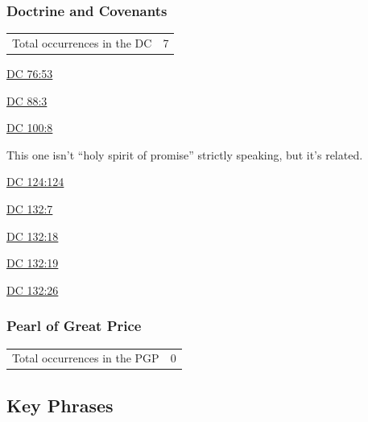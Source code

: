 		
	\subsubsection{Doctrine and Covenants} %
		\label{HSOP-DC}
	
		\begin{tabular}{ll}
			Total occurrences in the DC & 7
		\end{tabular}
		
		\begin{compactdesc}
			\item[{\hyperref[DC76-53]{DC 76:53}}]
			\item[{\hyperref[DC88-3]{DC 88:3}}]
			\item[{\hyperref[DC100-8]{DC 100:8}}] \phantom{.}
				\begin{compactitem}
					\item This one isn't ``holy spirit of promise'' strictly speaking, but it's related.
				\end{compactitem}
			\item[{\hyperref[DC124-124]{DC 124:124}}]
			\item[{\hyperref[DC132-7]{DC 132:7}}]
			\item[{\hyperref[DC132-18]{DC 132:18}}]
			\item[{\hyperref[DC132-19]{DC 132:19}}]
			\item[{\hyperref[DC132-26]{DC 132:26}}]
		\end{compactdesc}
		
	\subsubsection{Pearl of Great Price} %
		\label{HSOP-PGP}
	
		\begin{tabular}{ll}
			Total occurrences in the PGP & 0
		\end{tabular}
		
		
\subsection{Key Phrases} %
	\label{HSOP-PHRASES}

